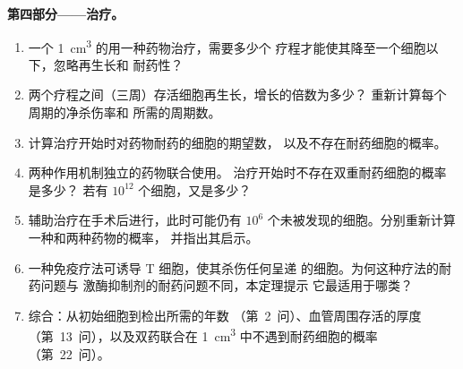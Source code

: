 \begin{problem}
\medskip
\noindent\textbf{第四部分——治疗。}
\begin{enumerate}[resume]
  \item 一个 \qty{1}{cm^3} 的用一种药物治疗，需要多少个
        疗程才能使其降至一个细胞以下，忽略再生长和
        耐药性？
  \item 两个疗程之间（三周）存活细胞再生长，增长的倍数为多少？
        重新计算每个周期的净杀伤率和
        所需的周期数。
  \item 计算治疗开始时对药物耐药的细胞的期望数，
        以及不存在耐药细胞的概率。
  \item 两种作用机制独立的药物联合使用。
        治疗开始时不存在双重耐药细胞的概率是多少？
        若有 $10^{12}$ 个细胞，又是多少？
  \item 辅助治疗在手术后进行，此时可能仍有 $10^{6}$
        个未被发现的细胞。分别重新计算一种和两种药物的概率，
        并指出其启示。
  \item 一种免疫疗法可诱导 T 细胞，使其杀伤任何呈递
        的细胞。为何这种疗法的耐药问题与
        激酶抑制剂的耐药问题不同，本定理提示
        它最适用于哪类？
  \item 综合：从初始细胞到检出所需的年数
        （第~2~问）、血管周围存活的厚度
        （第~13~问），以及双药联合在
        \qty{1}{cm^3} 中不遇到耐药细胞的概率
        （第~22~问）。
\end{enumerate}
\end{problem}
